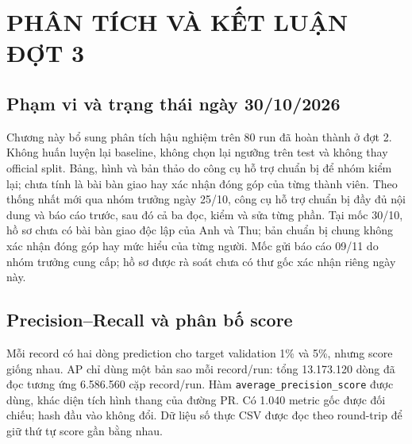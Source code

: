 
\chapter{PHÂN TÍCH VÀ KẾT LUẬN ĐỢT 3}
\label{chap:dot3}
\section{Phạm vi và trạng thái ngày 30/10/2026}
Chương này bổ sung phân tích hậu nghiệm trên 80 run đã hoàn thành ở đợt 2. Không huấn luyện lại baseline, không chọn lại ngưỡng trên test và không thay official split. Bảng, hình và bản thảo do công cụ hỗ trợ chuẩn bị để nhóm kiểm lại; chưa tính là bài bàn giao hay xác nhận đóng góp của từng thành viên. Theo thống nhất mới qua nhóm trưởng ngày 25/10, công cụ hỗ trợ chuẩn bị đầy đủ nội dung và báo cáo trước, sau đó cả ba đọc, kiểm và sửa từng phần. Tại mốc 30/10, hồ sơ chưa có bài bàn giao độc lập của Anh và Thu; bản chuẩn bị chung không xác nhận đóng góp hay mức hiểu của từng người. Mốc gửi báo cáo 09/11 do nhóm trưởng cung cấp; hồ sơ được rà soát chưa có thư gốc xác nhận riêng ngày này.



\section{Precision--Recall và phân bố score}
Mỗi record có hai dòng prediction cho target validation 1\% và 5\%, nhưng score giống nhau. AP chỉ dùng một bản sao mỗi record/run: tổng 13.173.120 dòng đã đọc tương ứng 6.586.560 cặp record/run. Hàm \texttt{average\_precision\_score} được dùng, khác diện tích hình thang của đường PR. Có 1.040 metric gốc được đối chiếu; hash đầu vào không đổi. Dữ liệu số thực CSV được đọc theo round-trip để giữ thứ tự score gần bằng nhau.

